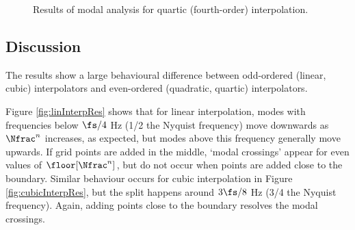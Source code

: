 \begin{figure}[h]
    \centering
    \hfill
    \caption{Results of modal analysis for quartic (fourth-order) interpolation.}\label{fig:quarticInterpRes}
\end{figure}

\subsection{Discussion}
The results show a large behavioural difference between odd-ordered (linear, cubic) interpolators and even-ordered (quadratic, quartic) interpolators.  

Figure \ref{fig:linInterpRes} shows that for linear interpolation, modes with frequencies below $\fs/4$ Hz (1/2 the Nyquist frequency) move downwards as $\Nfrac^n$ increases, as expected, but modes above this frequency generally move upwards. If grid points are added in the middle, `modal crossings' appear for even values of $\floor[\Nfrac^n]$, but do not occur when points are added close to the boundary. Similar behaviour occurs for cubic interpolation in Figure \ref{fig:cubicInterpRes}, but the split happens around $3\fs/8$ Hz (3/4 the Nyquist frequency). Again, adding points close to the boundary resolves the modal crossings. 

